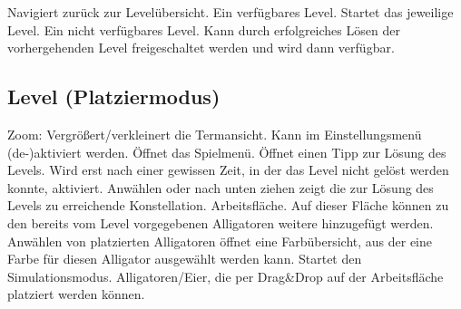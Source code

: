 \begin{requirements}
 Navigiert zurück zur Levelübersicht.
 Ein verfügbares Level. Startet das jeweilige Level.
 Ein nicht verfügbares Level. Kann durch erfolgreiches Lösen der vorhergehenden Level freigeschaltet werden und wird dann verfügbar.
\end{requirements}

\subsection{Level (Platziermodus)}

\begin{center}
\setlength\fboxsep{20pt}
\setlength\fboxrule{1pt}
\end{center}

\begin{requirements}
 Zoom: Vergrößert/verkleinert die Termansicht. Kann im Einstellungsmenü (de-)aktiviert werden.
 Öffnet das Spielmenü.
 Öffnet einen Tipp zur Lösung des Levels. Wird erst nach einer gewissen Zeit, in der das Level nicht gelöst werden konnte, aktiviert.
 Anwählen oder nach unten ziehen zeigt die zur Lösung des Levels zu erreichende Konstellation.
 Arbeitsfläche. Auf dieser Fläche können zu den bereits vom Level vorgegebenen Alligatoren weitere hinzugefügt werden. Anwählen von platzierten Alligatoren öffnet eine Farbübersicht, aus der eine Farbe für diesen Alligator ausgewählt werden kann.
 Startet den Simulationsmodus.
 Alligatoren/Eier, die per Drag\&Drop auf der Arbeitsfläche platziert werden können.
\end{requirements}

